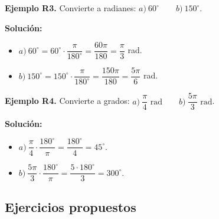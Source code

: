 \documentclass[12pt, letterpaper]{article}
\begin{document}
\textbf{Ejemplo R3.} Convierte a radianes: $a)\ 60^{\circ} \qquad b)\ 150^{\circ}$.

\begin{cuadrosolucion}
  \textbf{Solución:}
  \begin{itemize}
    \item $a)\ 60^{\circ} = 60^{\circ} \cdot \dfrac{\pi}{180^{\circ}} = \dfrac{60\pi}{180} = \dfrac{\pi}{3}$ rad.
    \item $b)\ 150^{\circ} = 150^{\circ} \cdot \dfrac{\pi}{180^{\circ}} = \dfrac{150\pi}{180} = \dfrac{5\pi}{6}$ rad.
  \end{itemize}
\end{cuadrosolucion}

\textbf{Ejemplo R4.} Convierte a grados: $a)\ \dfrac{\pi}{4} \text{ rad} \qquad b)\ \dfrac{5\pi}{3} \text{ rad}$.

\begin{cuadrosolucion}
  \textbf{Solución:}
  \begin{itemize}
    \item $a)\ \dfrac{\pi}{4} \cdot \dfrac{180^{\circ}}{\pi} = \dfrac{180^{\circ}}{4} = 45^{\circ}$.
    \item $b)\ \dfrac{5\pi}{3} \cdot \dfrac{180^{\circ}}{\pi} = \dfrac{5 \cdot 180^{\circ}}{3} = 300^{\circ}$.
  \end{itemize}
\end{cuadrosolucion}

\subsection{Ejercicios propuestos}
\end{document}
